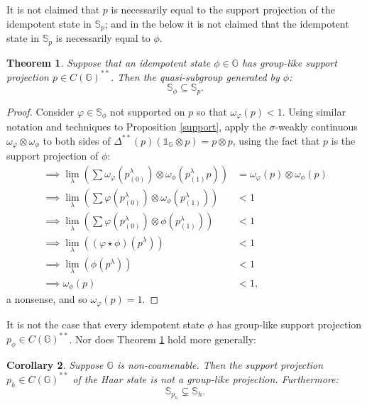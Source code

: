 \documentclass[12pt]{amsart}
\newtheorem{theorem}{Theorem}[section]
\newtheorem{corollary}[theorem]{Corollary}
\theoremstyle{remark}
\theoremstyle{remark}
\begin{document}
It is not claimed that $p$ is  necessarily equal to the support projection of the idempotent state in $\mathbb{S}_p$; and in the below it is not claimed that the idempotent state in $\mathbb{S}_p$ is necessarily equal to $\phi$.
\begin{theorem}\label{pqprops}
Suppose that an idempotent state $\phi\in\mathbb{G}$  has group-like support projection $p\in C(\mathbb{G})^{**}$. Then the quasi-subgroup generated by $\phi$:
$$\mathbb{S}_\phi\subseteq \mathbb{S}_p.$$
\end{theorem}
\begin{proof}
Consider $\varphi\in \mathbb{S}_\phi$ not supported on $p$ so that $\omega_{\varphi}(p)<1$.
Using similar notation and techniques to Proposition \ref{support}, apply the $\sigma$-weakly continuous $\omega_{\varphi}\otimes \omega_{\phi}$ to both sides of $\Delta^{**}(p)(\mathds{1}_{\mathbb{G}}\otimes p)=p\otimes p$, using the fact that $p$ is the support projection of $\phi$:
  \begin{align*}
    \implies \lim_\lambda \left(\sum \omega_{\varphi}(p^\lambda_{(0)})\otimes \omega_{\phi}(p^\lambda_{(1)}p)\right) & =\omega_{\varphi}(p)\otimes \omega_{\phi}(p)\\
     \implies \lim_\lambda \left(\sum \varphi(p^\lambda_{(0)})\otimes \omega_{\phi}(p^\lambda_{(1)})\right) & <1\\
      \implies \lim_\lambda \left(\sum \varphi(p^\lambda_{(0)})\otimes \phi(p^\lambda_{(1)})\right) & <1\\
        \implies \lim_\lambda \left((\varphi\star \phi)(p^\lambda)\right) & <1\\
        \implies \lim_\lambda \left(\phi(p^\lambda)\right) & <1
        \\ \implies \omega_{\phi}(p)&<1,
  \end{align*}
a nonsense,  and so $\omega_\varphi(p)=1$.
\end{proof}

It is not the case that every idempotent state $\phi$  has group-like support projection $p_\phi\in C(\mathbb{G})^{**}$. Nor does Theorem \ref{pqprops} hold more generally:

\begin{corollary}\label{conversefail}
Suppose $\mathbb{G}$ is non-coamenable. Then the support projection $p_h\in C(\mathbb{G})^{**}$ of the Haar state is not a group-like projection. Furthermore:
$$\mathbb{S}_{p_h}\subsetneq \mathbb{S}_h.$$

\end{corollary}
\end{document}
